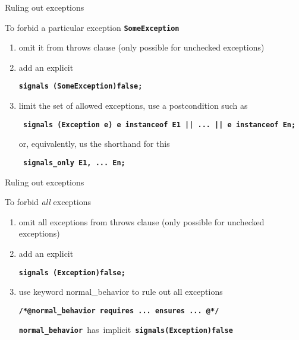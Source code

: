 \documentclass[
pdf,
nocolorBG,
slideColor,
erik,
]{prosper}
\newcommand{\code}[1]{{\rm \texttt{\textbf{\small #1}}}}
\begin{document}
\begin{slide}{Ruling out exceptions}
\vspace*{-3ex}

To forbid a particular exception \code{SomeException}
\begin{enumerate}
\item omit it from throws clause (only possible for unchecked exceptions)
\item add an explicit
\begin{alltt} \code{\scriptsize{\blue signals} (SomeException){\green false};}
\end{alltt}

\item limit the set of allowed exceptions, use a postcondition such as
\begin{alltt}\code{\scriptsize
    signals (Exception e) e instanceof E1 
                       || ... 
                       || e instanceof En;}
\end{alltt}
or, equivalently, us the shorthand for this
\begin{alltt}\code{\scriptsize
    signals_only E1, ... En;}
\end{alltt}

\end{enumerate}

\end{slide}


\begin{slide}{Ruling out exceptions}
\vspace*{-3ex}

To forbid \textit{all} exceptions
\begin{enumerate}
\item omit all exceptions from throws clause (only possible for unchecked exceptions)
\item add an explicit
\begin{alltt} \code{\scriptsize{\blue signals} (Exception){\green false};}
\end{alltt}
\item
use keyword {\blue normal\_behavior} to rule out all exceptions
\begin{alltt} \code{\scriptsize {\green /*@}{\blue normal\_behavior}
       {\black requires} ...
       {\black ensures}  ...
    {\green @*/}
}
\end{alltt}
\mbox{\code{normal\_behavior} has implicit
\code{signals(Exception)false}}
\end{enumerate}

\end{slide}
\end{document}

